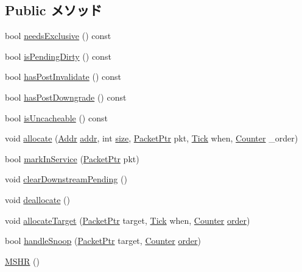 \subsection*{Public メソッド}
\begin{DoxyCompactItemize}
\item 
bool \hyperlink{classMSHR_aa8e449288b878ff3ff7f286eb4d28b6a}{needsExclusive} () const 
\item 
bool \hyperlink{classMSHR_a46636974002da45a91f2019ff47b5025}{isPendingDirty} () const 
\item 
bool \hyperlink{classMSHR_a492fb8bb0290ba36d8d05d9f86b8e754}{hasPostInvalidate} () const 
\item 
bool \hyperlink{classMSHR_a74c74cd6091f9e3e1523d3044ae9e9b4}{hasPostDowngrade} () const 
\item 
bool \hyperlink{classMSHR_a70c74b2809417ea8701dd6ba9e34312d}{isUncacheable} () const 
\item 
void \hyperlink{classMSHR_aea3dd4d447084fd85a6d737beefdc594}{allocate} (\hyperlink{base_2types_8hh_af1bb03d6a4ee096394a6749f0a169232}{Addr} \hyperlink{classMSHR_a0bb77b4ba61e408313e1118250f9278c}{addr}, int \hyperlink{classMSHR_a439227feff9d7f55384e8780cfc2eb82}{size}, \hyperlink{classPacket}{PacketPtr} pkt, \hyperlink{base_2types_8hh_a5c8ed81b7d238c9083e1037ba6d61643}{Tick} when, \hyperlink{base_2types_8hh_ae1475755791765b8e6f6a8bb091e273e}{Counter} \_\-order)
\item 
bool \hyperlink{classMSHR_a89f5689827090dd1998bd3906e5454d1}{markInService} (\hyperlink{classPacket}{PacketPtr} pkt)
\item 
void \hyperlink{classMSHR_aba459a1fb9c4f01c1911655c1db0e8e4}{clearDownstreamPending} ()
\item 
void \hyperlink{classMSHR_a2d68be4fd20ffdd7f7a9b51579eacc2f}{deallocate} ()
\item 
void \hyperlink{classMSHR_a84c132450efb0381229d03bba92d3d1d}{allocateTarget} (\hyperlink{classPacket}{PacketPtr} target, \hyperlink{base_2types_8hh_a5c8ed81b7d238c9083e1037ba6d61643}{Tick} when, \hyperlink{base_2types_8hh_ae1475755791765b8e6f6a8bb091e273e}{Counter} \hyperlink{classMSHR_a268baba59d9078c070be7059fd90d9bc}{order})
\item 
bool \hyperlink{classMSHR_a7501595166901f8ddffcad271441cdf4}{handleSnoop} (\hyperlink{classPacket}{PacketPtr} target, \hyperlink{base_2types_8hh_ae1475755791765b8e6f6a8bb091e273e}{Counter} \hyperlink{classMSHR_a268baba59d9078c070be7059fd90d9bc}{order})
\item 
\hyperlink{classMSHR_ac9bcc3c4e7dc13e809c1ddc72d1df7b2}{MSHR} ()

\end{DoxyCompactItemize}
